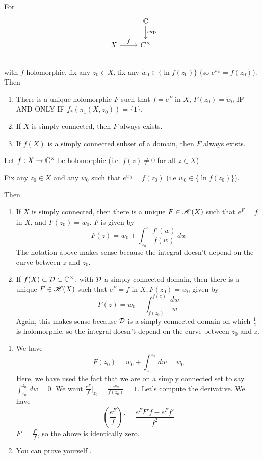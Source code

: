 \documentclass[x11names,reqno,14pt]{extarticle}
\begin{document}
For 
\[
\begin{tikzcd}
& \C \ar[d, "\exp"] \\ X \ar[r, "f"] & C^\times \\
\end{tikzcd}
\]
with $f$ holomorphic, fix any $z_0 \in X$, fix any $\tilde{w}_0 \in \{\ln f(z_0)\}$ (so $e^{\tilde{w}_0} = f(z_0)$). Then
\begin{enumerate}[label=(\roman*)]
\item There is a unique holomorphic $F$ such that $f = e^F$ in $X$, $F(z_0) = \tilde{w}_0$ IF AND ONLY IF $f_*(\pi_1(X, z_0)) = \{1\}$.
\item If $X$ is simply connected, then $F$ always exists. 
\item If $f(X)$ is a simply connected subset of a domain, then $F$ always exists. 
\end{enumerate}

\thm

Let $f:X\to \mathbb{C}^\times$ be holomorphic (i.e. $f(z)\neq0$ for all $z \in X$)

Fix any $z_0 \in X$ and any $w_0$ such that $e^{w_0} = f(z_0)$ (i.e $w_0 \in \{\ln f(z_0)\}$). 

Then
\begin{enumerate}[label=(\roman*)]
\item If $X$ is simply connected, then there is a unique $F \in \mathscr{H}(X)$ such that $e^F = f$ in $X$, and $F(z_0) = w_0$. $F$ is given by
\[
F(z) = w_0 + \int_{z_0}^z\frac{f'(w)}{f(w)}\,dw
\]
The notation above makes sense because the integral doesn't depend on the curve between $z$ and $z_0$.
\item If $f(X) \subset \mathcal{D} \subset \mathbb{C}^\times$, with $\mathcal{D}$ a simply connected domain, then there is a unique $F \in \mathscr{H}(X)$ such that $e^F = f$ in $X, F(z_0) = w_0$ given by
\[
F(z) = w_0 + \int_{f(z_0)}^{f(z)}\frac{dw}{w}
\]
Again, this makes sense because $\mathcal{D}$ is a simply connected domain on which $\frac{1}{z}$ is holomorphic, so the integral doesn't depend on the curve between $z_0$ and $z$. 
\end{enumerate}

\proof

\begin{enumerate}[label=(\alph*)]
\item We have
\[
F(z_0) = w_0 + \int_{z_0}^{z_0}\,dw = w_0
\]
Here, we have used the fact that we are on a simply connected set to say $\int_{z_0}^{z_0} \,dw = 0$.  We want $\frac{e^F}{f}|_{z_0} = \frac{e^{w_0}}{f(z_0)} = 1$. Let's compute the derivative. We have
\[
\left(\frac{e^F}{f}\right)' = \frac{e^FF'f - e^Ff'}{f^2}
\]
$F' = \frac{f'}{f}$, so the above is identically zero. 
\item You can prove yourself .
\end{enumerate}
\end{document}
